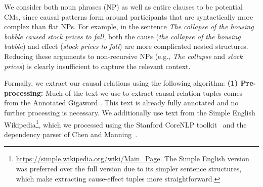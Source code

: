 We consider both noun phrases (NP) as well as entire %
clauses to be potential CMs, since causal patterns form around participants that are syntactically more complex than flat NPs.  
For example, in the sentence \emph{The collapse of the housing bubble caused stock prices to fall}, both the cause ({\em the collapse of the housing bubble}) and effect ({\em stock prices to fall}) are more complicated nested structures.  Reducing these arguments to non-recursive NPs (e.g., {\em The collapse} and {\em stock prices}) is clearly insufficient to capture the relevant context.


%
%



Formally, we extract our causal relations using the following algorithm:
{\flushleft \textbf{(1) Pre-processing:}} Much of the text we use to extract causal relation tuples comes from the Annotated Gigaword \cite{napoles2012annotated}.  This text is already fully annotated and no further processing is necessary.  We additionally use text from the Simple English Wikipedia\footnote{{\scriptsize \url{https://simple.wikipedia.org/wiki/Main_Page}}.  The Simple English version was preferred over the full version due to its simpler sentence structures, which make extracting cause-effect tuples more straightforward.}, which we processed using the Stanford CoreNLP toolkit~\cite{Manning:14} and the dependency parser of Chen and Manning~.

